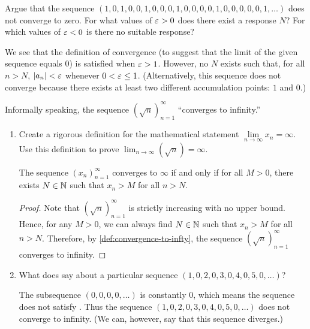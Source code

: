 \begin{problem}
  Argue that the sequence $(1, 0, 1, 0, 0, 1, 0, 0, 0, 1, 0, 0, 0, 0, 1, 0, 0, 0, 0, 0, 1, \ldots)$ does not converge to zero. For what values of $\varepsilon > 0$
  does there exist a response $N$? For which values of $\varepsilon < 0$ is there no
  suitable response? 

  \vspace{\baselineskip}

    We see that the definition of convergence (to suggest that the limit of the
    given sequence equals $0$) is satisfied when $\varepsilon > 1$. However, no $N$
    exists such that, for all $n > N$, $\left\lvert a_{n} \right\rvert < \varepsilon$ whenever $0 < \varepsilon \leq 1$. 
    (Alternatively, this sequence does not converge because there exists at least
    two different accumulation points: $1$ and $0$.)
\end{problem}

\begin{problem}
  Informally speaking, the sequence $(\sqrt{n})_{n=1}^{\infty}$ ``converges to infinity.''

  \begin{enumerate}[label=(\alph*)]
      \item Create a rigorous definition for the mathematical statement $\lim\limits_{n \to \infty} x_{n} = \infty$. Use this
        definition to prove $\lim_{n \to \infty} (\sqrt{n}) = \infty$.

        \begin{definition}
          \label{def:convergence-to-infty}
          The sequence $(x_{n})_{n=1}^{\infty}$ converges to $\infty$ if and only if
          for all $M > 0$, there exists $N \in \mathbb{N}$ such that $x_{n} > M$ 
          for all $n > N$.
        \end{definition}

        \begin{proof}
          Note that $(\sqrt{n})_{n=1}^{\infty}$ is strictly increasing with no upper bound. 
          Hence, for any $M > 0$, we can always find $N \in \mathbb{N}$ such that $x_{n} > M$ for all $n > N$. 
          Therefore, by \ref{def:convergence-to-infty}, the sequence $(\sqrt{n})_{n=1}^{\infty}$ 
          converges to infinity.
        \end{proof}

      \item What does  say about a particular sequence
        $(1, 0, 2, 0, 3, 0, 4, 0, 5, 0, \ldots)$?

        The subsequence $(0, 0, 0, 0, \ldots)$ is constantly $0$, which means
        the sequence does not satisfy . Thus
        the sequence $(1, 0, 2, 0, 3, 0, 4, 0, 5, 0, \ldots)$ does not converge 
        to infinity. (We can, however, say that this sequence diverges.)

  \end{enumerate}
\end{problem}

